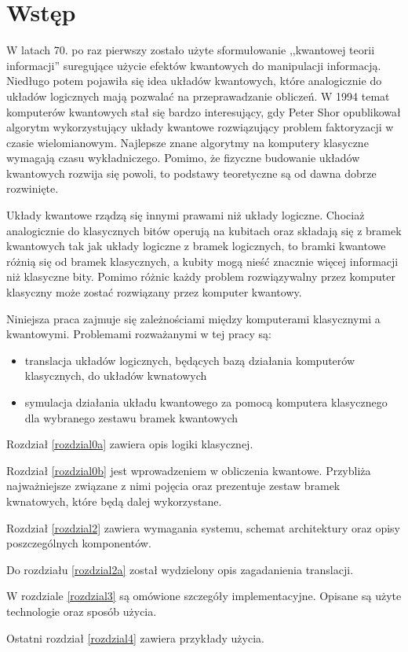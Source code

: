 \chapter{Wstęp}
\thispagestyle{chapterBeginStyle}

W latach 70. po raz pierwszy zostało użyte sformułowanie ,,kwantowej teorii informacji'' suregujące użycie efektów kwantowych do manipulacji informacją. Niedługo potem pojawiła się idea układów kwantowych, które analogicznie do układów logicznych mają pozwalać na przeprawadzanie obliczeń. W 1994 temat komputerów kwantowych stał się bardzo interesujący, gdy Peter Shor opublikował algorytm wykorzystujący układy kwantowe rozwiązujący problem faktoryzacji w czasie wielomianowym. Najlepsze znane algorytmy na komputery klasyczne wymagają czasu wykładniczego. Pomimo, że fizyczne budowanie układów kwantowych rozwija się powoli, to podstawy teoretyczne są od dawna dobrze rozwinięte.

Układy kwantowe rządzą się innymi prawami niż układy logiczne. Chociaż analogicznie do klasycznych bitów operują na kubitach oraz składają się z bramek kwantowych tak jak układy logiczne z bramek logicznych, to bramki kwantowe różnią się od bramek klasycznych, a kubity mogą nieść znacznie więcej informacji niż klasyczne bity. Pomimo różnic każdy problem rozwiązywalny przez komputer klasyczny może zostać rozwiązany przez komputer kwantowy.

Niniejsza praca zajmuje się zależnościami między komputerami klasycznymi a kwantowymi. Problemami rozważanymi w tej pracy są:
\begin{itemize}
    \item translacja układów logicznych, będących bazą działania komputerów klasycznych, do układów kwnatowych
    \item symulacja działania układu kwantowego za pomocą komputera klasycznego dla wybranego zestawu bramek kwantowych
\end{itemize}
\vspace{5mm}

Rozdział \ref{rozdzial0a} zawiera opis logiki klasycznej.

Rozdział \ref{rozdzial0b} jest wprowadzeniem w obliczenia kwantowe. Przybliża najważniejsze związane z nimi pojęcia oraz prezentuje zestaw bramek kwnatowych, które będą dalej wykorzystane.

Rozdział \ref{rozdzial2} zawiera wymagania systemu, schemat architektury oraz opisy poszczególnych komponentów.

Do rozdziału \ref{rozdzial2a} został wydzielony opis zagadanienia translacji.

W rozdziale \ref{rozdzial3} są omówione szczegóły implementacyjne. Opisane są użyte technologie oraz sposób użycia.

Ostatni rozdział \ref{rozdzial4} zawiera przykłady użycia.